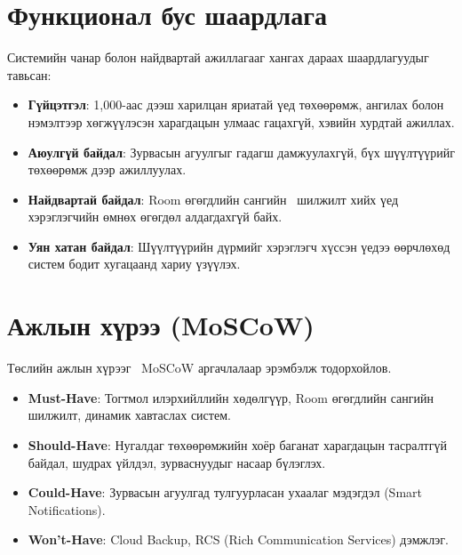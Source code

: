 \section{Функционал бус шаардлага}
Системийн чанар болон найдвартай ажиллагааг хангах дараах шаардлагуудыг тавьсан:
\begin{itemize}
    \item \textbf{Гүйцэтгэл}: 1,000-аас дээш харилцан яриатай үед төхөөрөмж, ангилах болон нэмэлтээр хөгжүүлэсэн харагдацын улмаас гацахгүй, хэвийн хурдтай  ажиллах.
    \item \textbf{Аюулгүй байдал}: Зурвасын агуулгыг гадагш дамжуулахгүй, бүх шүүлтүүрийг төхөөрөмж дээр  ажиллуулах.
    \item \textbf{Найдвартай байдал}: Room өгөгдлийн сангийн~\cite{room_guide} шилжилт хийх үед хэрэглэгчийн өмнөх өгөгдөл алдагдахгүй байх.
    \item \textbf{Уян хатан байдал}: Шүүлтүүрийн дүрмийг хэрэглэгч хүссэн үедээ өөрчлөхөд систем бодит хугацаанд хариу үзүүлэх.
\end{itemize}

\section{Ажлын хүрээ (MoSCoW)}
Төслийн ажлын хүрээг~\cite{clegg1994case} MoSCoW аргачлалаар эрэмбэлж тодорхойлов.
\begin{itemize}
    \item \textbf{Must-Have}: Тогтмол илэрхийллийн хөдөлгүүр, Room өгөгдлийн сангийн шилжилт, динамик хавтаслах систем.
    \item \textbf{Should-Have}: Нугалдаг төхөөрөмжийн хоёр баганат харагдацын тасралтгүй байдал, шудрах үйлдэл, зурваснуудыг насаар бүлэглэх.
    \item \textbf{Could-Have}: Зурвасын агуулгад тулгуурласан ухаалаг мэдэгдэл (Smart Notifications).
    \item \textbf{Won't-Have}: Cloud Backup, RCS (Rich Communication Services) дэмжлэг.
\end{itemize}
